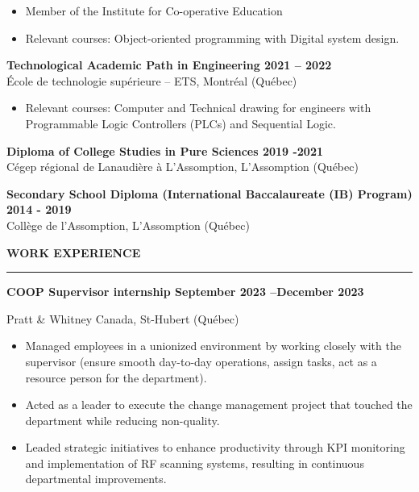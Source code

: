 \documentclass[letterpaper,11pt]{article}
\begin{document}
\begin{itemize}
\setlength{\itemsep}{-3pt}
\item
  Member of the Institute for Co-operative Education
\item
  Relevant courses: Object-oriented programming with Digital system
  design.
\end{itemize}

\textbf{Technological Academic Path in Engineering \hfill 2021 -- 2022}
\\École de technologie supérieure -- ETS, Montréal (Québec)

\begin{itemize}
\setlength{\itemsep}{-3pt}
\item
  Relevant courses: Computer and Technical drawing for engineers with
  Programmable Logic Controllers (PLCs) and Sequential Logic.
\end{itemize}

\textbf{Diploma of College Studies in Pure Sciences \hfill 2019 -2021}
\\
Cégep régional de Lanaudière à L'Assomption, L'Assomption (Québec)

\textbf{Secondary School Diploma (International Baccalaureate (IB)
Program) \hfill 2014 - 2019}
\\
Collège de l'Assomption, L'Assomption (Québec)


\newpage
\textbf{WORK EXPERIENCE}\par
\vspace{-20pt}
\rule{\textwidth}{0.4pt}
\textbf{COOP Supervisor internship \hfill September 2023 --December 2023}
\par
\vspace{-15pt}
Pratt \& Whitney Canada, St-Hubert (Québec)

\begin{itemize}
\setlength{\itemsep}{-3pt}
\item
  Managed employees in a unionized environment by working closely with
  the supervisor (ensure smooth day-to-day operations, assign tasks, act
  as a resource person for the department).
\item
  Acted as a leader to execute the change management project that touched the department while reducing non-quality. 
\item
Leaded strategic initiatives to enhance productivity through KPI monitoring and implementation of RF scanning systems, resulting in continuous departmental improvements.
\end{itemize}
\end{document}
